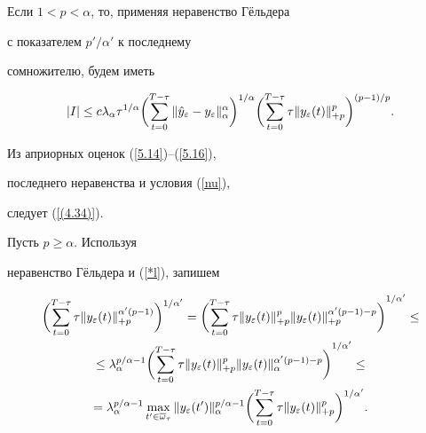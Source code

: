 Если $ 1 < p < \alpha $, то, применяя неравенство Г\"ельдера


с показателем $p'/ \alpha '$ к последнему


сомножителю, будем иметь


$$


| I | \le c


\lambda _{\alpha }\tau^{1/\alpha}


\biggl( \sum^{T-\tau}_{t=0}


\| \Hat{y}_\varepsilon - y_\varepsilon \|


^{\alpha }_{\alpha} \biggr)^{1/\alpha}


\biggl( \sum^{T-\tau}_{t=0}\tau


\|  y_\varepsilon(t) \| ^{p}_{+p} \biggr)^{(p-1)/p}.


$$





Из априорных оценок (\ref{5.14})--(\ref{5.16}),


последнего неравенства и условия (\ref{nu}),


следует (\ref{(4.34)}).





Пусть $ p \ge \alpha $. Используя


неравенство Г\"ельдера и (\ref{*l}), запишем


\begin{gather}


\biggl( \sum^{T-\tau }_{t=0}


\tau\|  y_\varepsilon(t) \|


^{\alpha '(p-1)}_{+p} \biggr)^{1/\alpha ' } =


{ \biggl( \sum^{T-\tau }_{t=0}\tau


\|  y_\varepsilon(t) \| ^{ p}_{+p}


\|  y_\varepsilon(t) \| ^{ \alpha '( p - 1 ) -p}_{+p}


\biggr) }^{1/{\alpha '}} \le\notag\\


%


\le \lambda ^{ p/\alpha-1}_{\alpha}


{ \biggl( \sum^{T-\tau}_{t=0}\tau


\|  y_\varepsilon(t) \| ^{p}_{+p}


\|  y_\varepsilon(t) { \| }^{\alpha '( p - 1 ) -p


 }_{\alpha} \biggr) }^{1/{ \alpha '} }\le\notag\\


%


= \lambda^{p/{\alpha}-1}_{\alpha} \max_{t' \in \overline{\omega}_{\tau} }


\| y_\varepsilon(t') \| ^{p/\alpha -1 }_{\alpha}


\biggl( \sum^{T-\tau}_{t=0} \tau \| y_\varepsilon(t) \| ^{p}_{+p}


\biggr)^{1/\alpha '}.


\label{(4.37)}


\end{gather}


